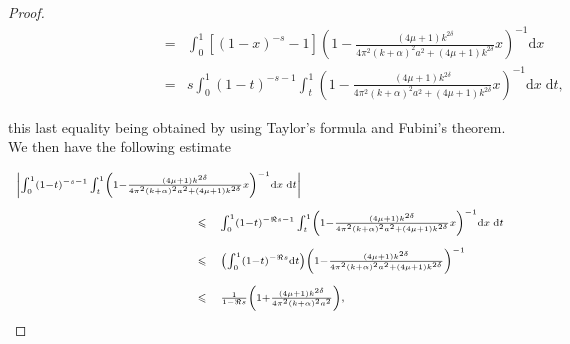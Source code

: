 \documentclass{jams-l}
\theoremstyle{definition}
\theoremstyle{remark}
\numberwithin{equation}{section}
\begin{document}
\begin{proof}
\[\begin{array}{lll}
                                \qquad \qquad \qquad \qquad \qquad & \scriptstyle = & \scriptstyle \int_0^1 \left[ \left( 1-x \right)^{-s} - 1 \right] \left( 1 - \frac{\left( 4 \mu + 1 \right) k^{2 \delta}}{4 \pi^2 \left( k + \alpha \right)^2 a^2 + \left( 4 \mu + 1 \right) k^{2 \delta}} x \right)^{-1} \mathrm{d}x \\[1.2em]
                                
                                & \scriptstyle = & \scriptstyle s \int_0^1 \left( 1-t \right)^{-s-1} \int_t^1 \left( 1 - \frac{\left( 4 \mu + 1 \right) k^{2 \delta}}{4 \pi^2 \left( k + \alpha \right)^2 a^2 + \left( 4 \mu + 1 \right) k^{2 \delta}} x \right)^{-1} \mathrm{d}x \; \mathrm{d}t,
                            \end{array} \]
                        
                        \noindent this last equality being obtained by using Taylor's formula and Fubini's theorem. We then have the following estimate
                        
                        \[ \begin{array}{lll}
                                \multicolumn{3}{l}{\scriptstyle \left \vert \int_0^1 \left( 1-t \right)^{-s-1} \int_t^1 \left( 1 - \frac{\left( 4 \mu + 1 \right) k^{2 \delta}}{4 \pi^2 \left( k + \alpha \right)^2 a^2 + \left( 4 \mu + 1 \right) k^{2 \delta}} x \right)^{-1} \mathrm{d}x \; \mathrm{d}t \right \vert} \\[1.2em]
                                
                                \qquad \qquad \qquad \qquad \qquad \qquad & \scriptstyle \leqslant & \scriptstyle \int_0^1 \left( 1-t \right)^{- \Re s - 1} \int_t^1 \left( 1 - \frac{\left( 4 \mu + 1 \right) k^{2 \delta}}{4 \pi^2 \left( k + \alpha \right)^2 a^2 + \left( 4 \mu + 1 \right) k^{2 \delta}} x \right)^{-1} \mathrm{d}x \; \mathrm{d}t \\[1.2em]
                                
                                & \scriptstyle \leqslant & \scriptstyle \left( \int_0^1 \left( 1-t \right)^{- \Re s} \mathrm{d}t \right) \left( 1 - \frac{\left( 4 \mu + 1 \right) k^{2 \delta}}{4 \pi^2 \left( k + \alpha \right)^2 a^2 + \left( 4 \mu + 1 \right) k^{2 \delta}} \right)^{-1} \\[1.2em]
                                
                                & \scriptstyle \leqslant & \scriptstyle \frac{1}{1 - \Re s} \left( 1 + \frac{\left( 4 \mu + 1 \right) k^{2 \delta}}{4 \pi^2 \left( k + \alpha \right)^2 a^2} \right),
                            \end{array} \]
                        

\end{proof}
\end{document}
